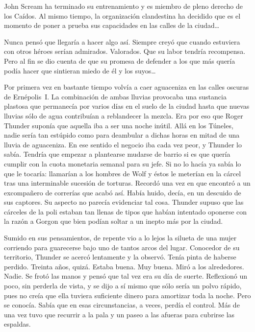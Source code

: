 \begin{prev}
    John Scream ha terminado su entrenamiento y es miembro de pleno derecho de los Caídos. Al mismo tiempo, la organización clandestina ha decidido que es el momento de poner a prueba sus capacidades en las calles de la ciudad\dots
\end{prev}

\noindent
Nunca pensó que llegaría a hacer algo así. Siempre creyó que cuando estuviera con otros héroes serían admirados. Valorados. Que su labor tendría recompensa. Pero al fin se dio cuenta de que su promesa de defender a los que más quería podía hacer que sintieran miedo de él y los suyos\dots

\bigskip\noindent
Por primera vez en bastante tiempo volvía a caer aguaceniza en las calles oscuras de Ernépolis~I. La combinación de ambas lluvias provocaba una sustancia plastosa que permanecía por varios días en el suelo de la ciudad hasta que nuevas lluvias sólo de agua contribuían a reblandecer la mezcla. Era por eso que Roger Thunder suponía que aquella iba a ser una noche inútil. Allá en los Túneles, nadie sería tan estúpido como para deambular a dichas horas en mitad de una lluvia de aguaceniza. En ese sentido el negocio iba cada vez peor, y Thunder lo sabía. Tendría que empezar a plantearse mudarse de barrio si es que quería cumplir con la cuota monetaria semanal para su jefe. Si no lo hacía ya sabía lo que le tocaría: llamarían a los hombres de Wolf y éstos le meterían en la cárcel tras una interminable sucesión de torturas. Recordó una vez en que encontró a un excompañero de correrías que acabó así. Había huido, decía, en un descuido de sus captores. Su aspecto no parecía evidenciar tal cosa. Thunder supuso que las cárceles de la poli estaban tan llenas de tipos que habían intentado oponerse con la razón a Gorgon que bien podían soltar a un inepto más por la ciudad.

Sumido en sus pensamientos, de repente vio a lo lejos la silueta de una mujer corriendo para guarecerse bajo uno de tantos arcos del lugar. Conocedor de su territorio, Thunder se acercó lentamente y la observó. Tenía pinta de haberse perdido. Treinta años, quizá. Estaba buena. Muy buena. Miró a los alrededores. Nadie. Se frotó las manos y pensó que tal vez era su día de suerte. Reflexionó un poco, sin perderla de vista, y se dijo a sí mismo que sólo sería un polvo rápido, pues no creía que ella tuviera suficiente dinero para amortizar toda la noche. Pero se conocía. Sabía que en esas circunstancias, a veces, perdía el control. Más de una vez tuvo que recurrir a la pala y un paseo a las afueras para cubrirse las espaldas.


